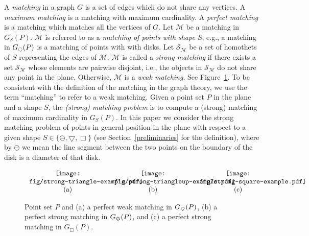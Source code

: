 \documentclass[11pt,a4paper]{article}
\newcommand{\G}[2]{G_{#1}({#2})}
\newcommand{\discs}{\scriptsize \Circle}
\newcommand{\ddisc}{\ominus}
\newcommand{\sqr}{\Box}
\newcommand{\trid}{\bigtriangledown}
\newcommand{\trids}{\scriptsize\bigtriangledown}
\newcommand{\GUD}{G_{\bigtriangledown \hspace*{-7.5pt} \bigtriangleup}}
\begin{document}
A {\em matching} in a graph $G$ is a set of edges which do not share any vertices. A {\em maximum matching} is a matching with maximum cardinality. A {\em perfect matching} is a matching which matches all the vertices of $G$. Let $\mathcal{M}$ be a matching in $\G{S}{P}$. $\mathcal{M}$ is referred to as a {\em matching of points with shape $S$}, e.g., a matching in $\G{\discs}{P}$ is a matching of points with with disks. Let $\mathcal{S}_{\mathcal{M}}$ be a set of homothets of $S$ representing the edges of $\mathcal{M}$. $\mathcal{M}$ is called a {\em strong matching} if there exists a set $\mathcal{S}_{\mathcal{M}}$ whose elements are pairwise disjoint, i.e., the objects in $\mathcal{S}_{\mathcal{M}}$ do not share any point in the plane. Otherwise, $\mathcal{M}$ is a {\em weak matching}. See Figure~\ref{strong-example}. To be consistent with the definition of the matching in the graph theory, we use the term ``matching'' to refer to a weak matching. Given a point set $P$ in the plane and a shape $S$, the {\em (strong) matching problem} is to compute a (strong) matching of maximum cardinality in $\G{S}{P}$.
In this paper we consider the strong matching problem of points in general position in the plane with respect to a given shape $S\in \{\ddisc,\trid, \sqr\}$ (see Section~\ref{preliminaries} for the definition), where by $\ddisc$ we mean the line segment between the two points on the boundary of the disk is a diameter of that disk.

\begin{figure}[htb]
  \centering
\setlength{\tabcolsep}{0in}
  $\begin{tabular}{ccc}
\multicolumn{1}{m{.33\columnwidth}}{\centering\texttt{[image: fig/strong-triangle-example.pdf]}}
&\multicolumn{1}{m{.33\columnwidth}}{\centering\texttt{[image: fig/strong-triangleup-example.pdf]}} &\multicolumn{1}{m{.33\columnwidth}}{\centering\texttt{[image: fig/strong-square-example.pdf]}}
\\
(a) & (b)& (c)
\end{tabular}$
  \caption{Point set $P$ and (a) a perfect weak matching in $\G{\trids}{P}$, (b) a perfect strong matching in $\GUD(P)$, and (c) a perfect strong matching in $
\G{\sqr}{P}$.}
\label{strong-example}
\end{figure}
\end{document}
